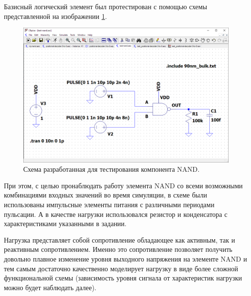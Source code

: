 Базисный логический элемент был протестирован с помощью схемы представленной на
изображении \ref{fig:nand-test}. 
\begin{figure}[htb]
    \centering
    \includegraphics[width=\textwidth]{res/nand_test-circuit.png}
    \caption{Схема разработанная для тестирования компонента NAND.}
    \label{fig:nand-test}
\end{figure}
При этом, с целью пронаблюдать работу элемента NAND со всеми возможными
комбинациями входных значений во время симуляции, в схеме были использованы
импульсные элементы питания с различными периодами пульсации. А в качестве
нагрузки использовался резистор и конденсатора с характеристиками указанными в
задании.

Нагрузка представляет собой сопротивление обладающее как активным, так и
реактивным сопротивлением. Именно это сопротивление позволяет получить довольно
плавное изменение уровня выходного напряжения на элементе NAND и тем самым
достаточно качественно моделирует нагрузку в виде более сложной функциональной
схемы (зависимость уровня сигнала от характеристик нагрузки можно будет
наблюдать далее). 


